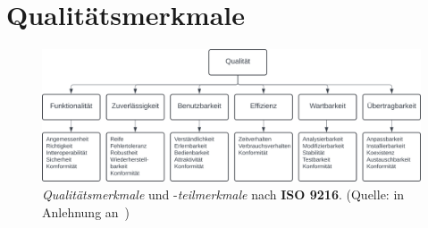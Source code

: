 \section{Qualitätsmerkmale}

\begin{figure}
    \centering
    \includegraphics[scale=0.4]{part four/Qualität/img/qualitätsmerkmale}
    \caption{\textit{Qualitätsmerkmale} und -\textit{teilmerkmale} nach \textbf{ISO 9216}. (Quelle: in Anlehnung an~\cite[Abb. 1.2, 3]{Wed09c})}
    \label{fig:qualitätsmerkmale-cc}
\end{figure}
